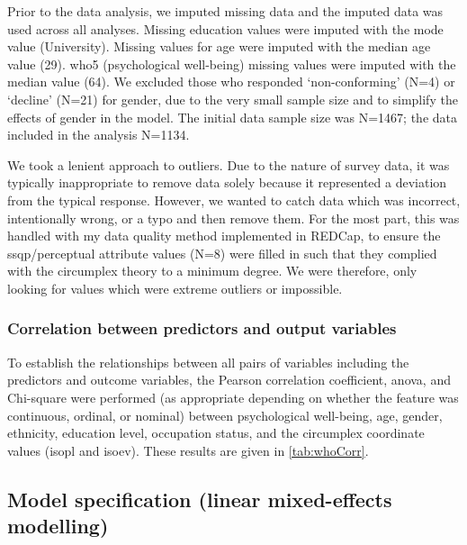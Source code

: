 Prior to the data analysis, we imputed missing data and the imputed data was used across all analyses. Missing education values were imputed with the mode value (University). Missing values for age were imputed with the median age value (29). \gls{who5} (psychological well-being) missing values were imputed with the median value (64). We excluded those who responded `non-conforming' (N=4) or `decline' (N=21) for gender, due to the very small sample size and to simplify the effects of gender in the model. The initial data sample size was N=1467; the data included in the analysis N=1134.

We took a lenient approach to outliers. Due to the nature of survey data, it was typically inappropriate to remove data solely because it represented a deviation from the typical response. However, we wanted to catch data which was incorrect, intentionally wrong, or a typo and then remove them. For the most part, this was handled with my data quality method implemented in REDCap, to ensure the \gls{ssqp}/perceptual attribute values (N=8) were filled in such that they complied with the circumplex theory to a minimum degree. We were therefore, only looking for values which were extreme outliers or impossible.

\subsubsection*{Correlation between predictors and output variables}
To establish the relationships between all pairs of variables including the predictors and outcome variables, the Pearson correlation coefficient, \gls{anova}, and Chi-square were performed (as appropriate depending on whether the feature was continuous, ordinal, or nominal) between psychological well-being, age, gender, ethnicity, education level, occupation status, and the circumplex coordinate values (\gls{isopl} and \gls{isoev}). These results are given in \cref{tab:whoCorr}.

\subsection{Model specification (linear mixed-effects modelling)}

